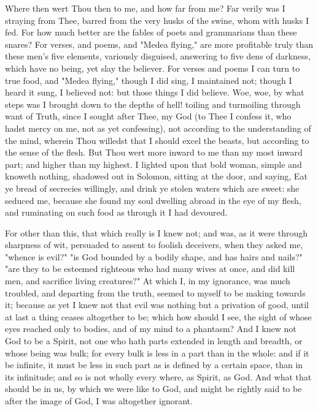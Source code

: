\documentclass[b5paper,openright,12pt,twoside]{book}
\begin{document}
Where then wert Thou then to me, and how far from me? Far verily was I
straying from Thee, barred from the very husks of the swine, whom with
husks I fed. For how much better are the fables of poets and grammarians
than these snares? For verses, and poems, and "Medea flying," are more
profitable truly than these men's five elements, variously disguised,
answering to five dens of darkness, which have no being, yet slay the
believer. For verses and poems I can turn to true food, and "Medea
flying," though I did sing, I maintained not; though I heard it sung,
I believed not: but those things I did believe. Woe, woe, by what steps
was I brought down to the depths of hell! toiling and turmoiling through
want of Truth, since I sought after Thee, my God (to Thee I confess
it, who hadst mercy on me, not as yet confessing), not according to the
understanding of the mind, wherein Thou willedst that I should excel
the beasts, but according to the sense of the flesh. But Thou wert more
inward to me than my most inward part; and higher than my highest. I
lighted upon that bold woman, simple and knoweth nothing, shadowed out
in Solomon, sitting at the door, and saying, Eat ye bread of secrecies
willingly, and drink ye stolen waters which are sweet: she seduced me,
because she found my soul dwelling abroad in the eye of my flesh, and
ruminating on such food as through it I had devoured.

For other than this, that which really is I knew not; and was, as it
were through sharpness of wit, persuaded to assent to foolish deceivers,
when they asked me, "whence is evil?" "is God bounded by a bodily shape,
and has hairs and nails?" "are they to be esteemed righteous who had
many wives at once, and did kill men, and sacrifice living creatures?"
At which I, in my ignorance, was much troubled, and departing from the
truth, seemed to myself to be making towards it; because as yet I knew
not that evil was nothing but a privation of good, until at last a thing
ceases altogether to be; which how should I see, the sight of whose eyes
reached only to bodies, and of my mind to a phantasm? And I knew not God
to be a Spirit, not one who hath parts extended in length and breadth,
or whose being was bulk; for every bulk is less in a part than in the
whole: and if it be infinite, it must be less in such part as is defined
by a certain space, than in its infinitude; and so is not wholly every
where, as Spirit, as God. And what that should be in us, by which we
were like to God, and might be rightly said to be after the image of
God, I was altogether ignorant.
\end{document}
